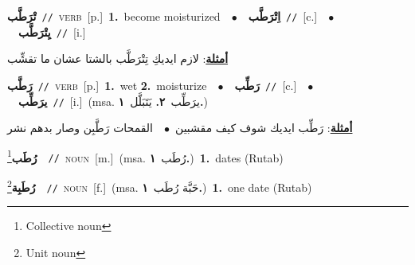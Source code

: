 \documentclass[10pt,a4paper,twoside]{article} %
\begin{document}
\begin{multicols}{2}
{\setlength\topsep{0pt}\textbf{\foreignlanguage{arabic}{تْرَطَّب}}\ {\color{gray}\texttt{//}\color{black}}\ \textsc{verb}\ [p.]\ \textbf{1.}~become moisturized\ \ $\bullet$\ \ \setlength\topsep{0pt}\textbf{\foreignlanguage{arabic}{اِتْرَطَّب}}\ {\color{gray}\texttt{//}\color{black}}\ [c.]\ \ $\bullet$\ \ \setlength\topsep{0pt}\textbf{\foreignlanguage{arabic}{يِتْرَطَّب}}\ {\color{gray}\texttt{//}\color{black}}\ [i.]\  \begin{flushright}\color{gray}\foreignlanguage{arabic}{\textbf{\underline{\foreignlanguage{arabic}{أمثلة}}}: لازم ايديكِ تِتْرَطَّب بالشتا عشان ما تقشِّب}\end{flushright}\color{black}} \vspace{2mm}

{\setlength\topsep{0pt}\textbf{\foreignlanguage{arabic}{رَطَّب}}\ {\color{gray}\texttt{//}\color{black}}\ \textsc{verb}\ [p.]\ \textbf{1.}~wet  \textbf{2.}~moisturize\ \ $\bullet$\ \ \setlength\topsep{0pt}\textbf{\foreignlanguage{arabic}{رَطِّب}}\ {\color{gray}\texttt{//}\color{black}}\ [c.]\ \ $\bullet$\ \ \setlength\topsep{0pt}\textbf{\foreignlanguage{arabic}{يرَطِّب}}\ {\color{gray}\texttt{//}\color{black}}\ [i.]\ \color{gray}(msa. \foreignlanguage{arabic}{يرَطِّب}~\foreignlanguage{arabic}{\textbf{٢.}}  \foreignlanguage{arabic}{يَتَبَلَّل}~\foreignlanguage{arabic}{\textbf{١.}})\color{black}\  \begin{flushright}\color{gray}\foreignlanguage{arabic}{\textbf{\underline{\foreignlanguage{arabic}{أمثلة}}}: رَطِّب ايديك شوف كيف مقشبين\ $\bullet$\ \  القمحات رَطَّبِن وصار بدهم نشر}\end{flushright}\color{black}} \vspace{2mm}

{\setlength\topsep{0pt}\textbf{\foreignlanguage{arabic}{رُطَب}}\footnote{Collective noun}\ \ {\color{gray}\texttt{//}\color{black}}\ \textsc{noun}\ [m.]\ \color{gray}(msa. \foreignlanguage{arabic}{رُطَب}~\foreignlanguage{arabic}{\textbf{١.}})\color{black}\ \textbf{1.}~dates (Rutab)\ } \vspace{2mm}

{\setlength\topsep{0pt}\textbf{\foreignlanguage{arabic}{رُطَبِة}}\footnote{Unit noun}\ \ {\color{gray}\texttt{//}\color{black}}\ \textsc{noun}\ [f.]\ \color{gray}(msa. \foreignlanguage{arabic}{حَبَّة رُطَب}~\foreignlanguage{arabic}{\textbf{١.}})\color{black}\ \textbf{1.}~one date (Rutab)\ } \vspace{2mm}


\end{multicols}
\end{document}
